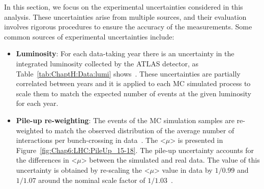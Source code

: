 In this section, we focus on the experimental uncertainties considered in this analysis. These 
uncertainties arise from multiple sources, and their evaluation involves rigorous procedures to ensure 
the accuracy of the measurements. Some common sources of experimental uncertainties include:
\begin{itemize}
	
	\item \textbf{Luminosity}: For each data-taking year there is an uncertainty in the integrated 
		luminosity collected by the ATLAS detector, 
		as Table~\ref{tab:ChaptH:Data:lumi} shows~\cite{ATLAS:2022hro, Avoni:2018iuv}. 
		These uncertainties are partially correlated between years and it is applied to each
		 MC simulated process to scale them to match the expected number of events 
		 at the given luminosity for each year.
	
	\item \textbf{Pile-up re-weighting}: The events of the MC simulation samples are re-weighted 
		to match the observed distribution of the average number of interactions per bunch-crossing 
		in data~\cite{Marshall:2014mza}. The <$\mu$> is presented in Figure~\ref{fig:Chap6:LHC:PileUp_15-18}. 
		The pile-up uncertainty accounts for the differences in <$\mu$> between the simulated and
		real data.
		The value of this uncertainty is obtained by re-scaling the <$\mu$>  value in data by 
		$1/0.99$ and $1/1.07$ around the nominal scale factor of $1/1.03$~\cite{Buttinger:2014726}.
	

\end{itemize}
